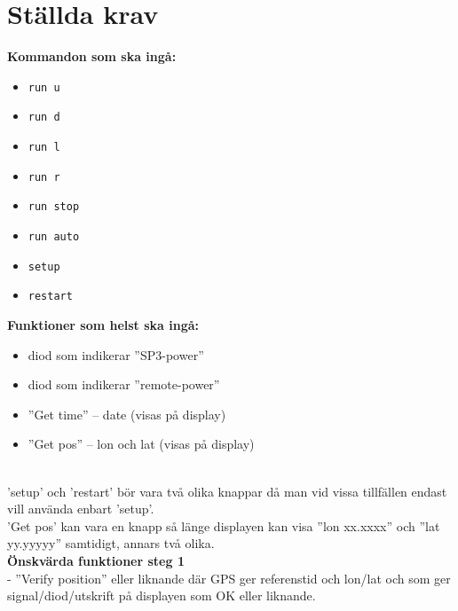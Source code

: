 \documentclass{article}
\begin{document}
	\section*{Ställda krav} %
	\label{sub:stallda_krav}

		\begin{minipage}[t]{0.5\textwidth}
		\noindent \textbf{Kommandon som ska ingå:}
			\begin{itemize}
				\item \texttt{run u}
				\item \texttt{run d}
				\item \texttt{run l}
				\item \texttt{run r}
				\item \texttt{run stop}
				\item \texttt{run auto}
				\item \texttt{setup}
				\item \texttt{restart }
			\end{itemize}
		\end{minipage}
		\begin{minipage}[t]{0.5\textwidth}
			\noindent \textbf{Funktioner som helst ska ingå:}
			\begin{itemize}
				\item  diod som indikerar ”SP3-power”
				\item  diod som indikerar ”remote-power”
				\item  ”Get time” -- date (visas på display)
				\item  ”Get pos” -- lon och lat (visas på display)
			\end{itemize}
		\end{minipage} \\

		\vspace{2mm}\noindent 'setup' och 'restart' bör vara två olika knappar då man vid vissa tillfällen endast vill använda enbart 'setup'.\\

		\noindent 'Get pos' kan vara en knapp så länge displayen kan visa ''lon xx.xxxx'' och ''lat yy.yyyyy'' samtidigt, annars två olika. \\

		\noindent \textbf{Önskvärda funktioner steg 1} \\
		-	”Verify position” eller liknande där GPS ger referenstid och lon/lat och som ger signal/diod/utskrift på displayen som OK eller liknande. \\
\end{document}
